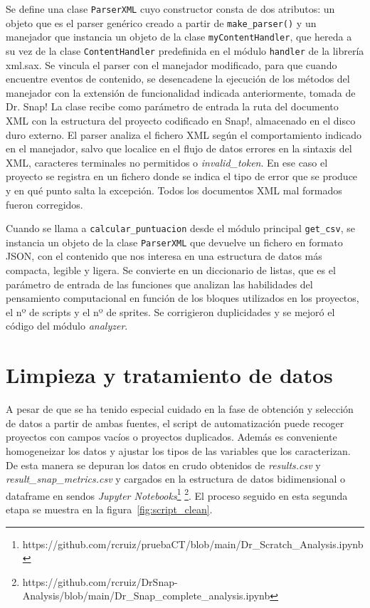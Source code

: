 \documentclass[a4paper, 12pt]{book}
\begin{document}
Se define una clase \texttt{ParserXML} cuyo constructor consta de dos atributos: un objeto que es el parser genérico creado a partir de \texttt{make\_parser()} y un manejador que instancia un objeto de la clase \texttt{myContentHandler}, que hereda a su vez de la clase \texttt{ContentHandler} predefinida en el módulo \texttt{handler} de la librería xml.sax. Se vincula el parser con el manejador modificado, para que cuando encuentre eventos de contenido, se desencadene la ejecución de los métodos del manejador con la extensión de funcionalidad indicada anteriormente, tomada de Dr. Snap! La clase recibe como parámetro de entrada la ruta del documento XML con la estructura del proyecto codificado en Snap!, almacenado en el disco duro externo. El parser analiza el fichero XML según el comportamiento indicado en el manejador, salvo que localice en el flujo de datos errores en la sintaxis del XML, caracteres terminales no permitidos o \emph{invalid\_token}. En ese caso el proyecto se registra en un fichero donde se indica el tipo de error que se produce y en qué punto salta la excepción. Todos los documentos XML mal formados fueron corregidos. 

Cuando se llama a \texttt{calcular\_puntuacion} desde el módulo principal \texttt{get\_csv}, se instancia un objeto de la clase \texttt{ParserXML} que devuelve un fichero en formato JSON, con el contenido que nos interesa en una estructura de datos más compacta, legible y ligera. Se convierte en un diccionario de listas, que es el parámetro de entrada de las funciones que analizan las habilidades del pensamiento computacional en función de los bloques utilizados en los proyectos, el nº de scripts y el nº de sprites. Se corrigieron duplicidades y se mejoró el código del módulo \emph{analyzer}.

\section{Limpieza y tratamiento de datos} 
\label{sec:clean_data}

A pesar de que se ha tenido especial cuidado en la fase de obtención y selección de datos a partir de ambas fuentes, el script de automatización puede recoger proyectos con campos vacíos o proyectos duplicados. Además es conveniente homogeneizar los datos y ajustar los tipos de las variables que los caracterizan. De esta manera se depuran los datos en crudo obtenidos de \emph{results.csv} y \emph{result\_snap\_metrics.csv} y cargados en la estructura de datos bidimensional o dataframe en sendos \emph{Jupyter Notebooks}\footnote{https://github.com/rcruiz/pruebaCT/blob/main/Dr\_Scratch\_Analysis.ipynb} \footnote{https://github.com/rcruiz/DrSnap-Analysis/blob/main/Dr\_Snap\_complete\_analysis.ipynb}. El proceso seguido en esta segunda etapa se muestra en la figura~\ref{fig:script_clean}. 
\end{document}
